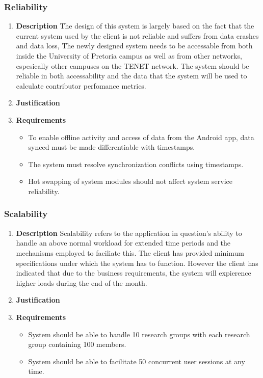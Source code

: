 \documentclass[a4paper,10pt]{article}
\begin{document}
\subsubsection{Reliability}
\begin{enumerate}
\item \textbf{Description}
The design of this system is largely based on the fact that the current system used by the client is not reliable and suffers from data crashes and data loss, The newly designed system needs to be accessable from both inside the University of Pretoria campus as well as from other networks, espesically other campuses on the TENET network. The system should be reliable in both accessability and the data that the system will be used to calculate contributor perfomance metrics. 
\item \textbf{Justification}
\item \textbf{Requirements}
	\begin{itemize}
		\item To enable offline activity and access of data from the Android app, data synced must be made differentiable with timestamps.
		\item The system must resolve synchronization conflicts using timestamps.
		\item Hot swapping of system modules should not affect system service reliability.
	\end{itemize}
\end{enumerate}

\subsubsection{Scalability}
\begin{enumerate}
\item \textbf{Description}
Scalability refers to the application in question's ability to handle an above normal workload for extended time periods and the mechanisms employed to faciliate this.  The client has provided minimum specifications under which the system has to function. However the client has indicated that due to the business requirements, the system will expierence higher loads during the end of the month.
\item \textbf{Justification}
\item \textbf{Requirements}
	\begin{itemize}
		\item System should be able to handle 10 research groups with each research group containing 100 members.
		\item System should be able to facilitate 50 concurrent user sessions at any time.
	\end{itemize}
\end{enumerate}
\end{document}
